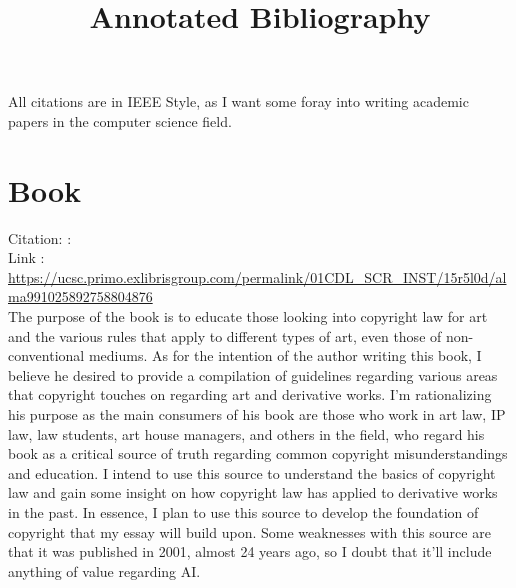 \documentclass{article}
\title{Annotated Bibliography}
\begin{document}
\maketitle

All citations are in IEEE Style, as I want some foray into writing academic
papers in the computer science field.


\section{Book}

Citation: \cite{stokes2021}:
\\
Link : \url{https://ucsc.primo.exlibrisgroup.com/permalink/01CDL_SCR_INST/15r5l0d/alma991025892758804876}
\\

The purpose of the book is to educate those looking into copyright law for
art and the various rules that apply to different types of art, even those
of non-conventional mediums. As for the intention of the author writing this
book, I believe he desired to provide a compilation of guidelines regarding
various areas that copyright touches on regarding art and derivative works. I'm
rationalizing his purpose as the main consumers of his book are those who work
in art law, IP law, law students, art house managers, and others in the field,
who regard his book as a critical source of truth regarding common copyright
misunderstandings and education. I intend to use this source to understand
the basics of copyright law and gain some insight on how copyright law has
applied to derivative works in the past. In essence, I plan to use this source
to develop the foundation of copyright that my essay will build upon. Some
weaknesses with this source are that it was published in 2001, almost 24
years ago, so I doubt that it'll include anything of value regarding AI.
\end{document}
